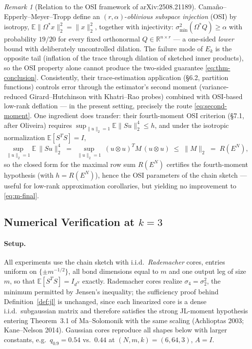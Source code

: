 \documentclass{article}
\theoremstyle{remark}
\newtheorem{remark}[theorem]{Remark}
\begin{document}
\begin{remark}[Relation to the OSI framework of arXiv:2508.21189]\label{rem:osi}
Cama\~no--Epperly--Meyer--Tropp define an $(r,\alpha)$-\emph{oblivious subspace injection} (OSI) by isotropy, $\mathbb{E}\|\Omega^* x\|_2^2 = \|x\|_2^2$, together with injectivity: $\sigma_{\min}^2(\Omega^* Q) \ge \alpha$ with probability $19/20$ for every fixed orthonormal $Q \in \mathbb{R}^{n \times r}$ --- a one-sided \emph{lower} bound with deliberately uncontrolled dilation. The failure mode of $E_k$ is the opposite tail (inflation of the trace through dilation of sketched inner products), so the OSI property alone cannot produce the two-sided guarantee \eqref{eq:thm-conclusion}. Consistently, their trace-estimation application (\S6.2, partition functions) controls error through the estimator's second moment (variance-reduced Girard--Hutchinson with Khatri--Rao probes) combined with OSI-based low-rank deflation --- in the present setting, precisely the route \eqref{eq:second-moment}. One ingredient does transfer: their fourth-moment OSI criterion (\S7.1, after Oliveira) requires $\sup_{\|u\|_2 = 1} \mathbb{E}\|S u\|_2^4 \le h$, and under the isotropic normalization $\mathbb{E}[S^T S] = I$,
\begin{equation}
\sup_{\|u\|_2=1} \mathbb{E}\,\|S u\|_2^4
\;=\; \sup_{\|u\|_2=1}\ (u \otimes u)^T M\, (u \otimes u)
\;\le\; \|M\|_2 \;=\; R(E^N),
\end{equation}
so the closed form for the maximal row sum $R(E^N)$ certifies the fourth-moment hypothesis (with $h = R(E^N)$), hence the OSI parameters of the chain sketch --- useful for low-rank approximation corollaries, but yielding no improvement to \eqref{eq:m-final}.
\end{remark}

\subsection{Numerical Verification at $k=3$}\label{sec:numerics}

\paragraph{Setup.}
All experiments use the chain sketch with i.i.d.\ \emph{Rademacher} cores, entries uniform on $\{\pm m^{-1/2}\}$, all bond dimensions equal to $m$ and one output leg of size $m$, so that $\mathbb{E}[S^TS]=I_{d^N}$ exactly. Rademacher cores realize $\sigma_4=\sigma_2^2$, the minimum permitted by Jensen's inequality; the sufficiency proof behind Definition~\ref{def:jl} is unchanged, since each linearized core is a dense i.i.d.\ subgaussian matrix and therefore satisfies the strong JL-moment hypothesis entering Theorem~3.1 of Ma--Solomonik with the same scaling (Achlioptas 2003; Kane--Nelson 2014). Gaussian cores reproduce all shapes below with larger constants, e.g.\ $q_{0.9}=0.54$ vs.\ $0.44$ at $(N,m,k)=(6,64,3)$, $A=I$.
\end{document}
